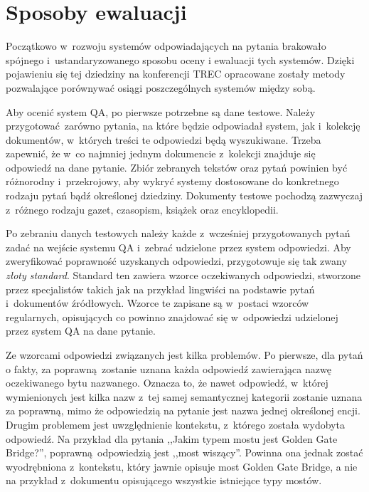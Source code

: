 \documentclass[a4paper, twoside, 12pt]{report}
\begin{document}
    \section{Sposoby ewaluacji}
        Początkowo w~rozwoju systemów odpowiadających na pytania brakowało spójnego i~ustandaryzowanego sposobu oceny i
        ewaluacji tych systemów. Dzięki pojawieniu się tej dziedziny na konferencji TREC opracowane zostały metody
        pozwalające porównywać osiągi poszczególnych systemów między sobą.

        Aby ocenić system QA, po pierwsze potrzebne są dane testowe. Należy przygotować zarówno pytania, na które będzie
        odpowiadał system, jak i~kolekcję dokumentów, w~których treści te odpowiedzi będą wyszukiwane. Trzeba zapewnić,
        że w~co najmniej jednym dokumencie z~kolekcji znajduje się odpowiedź na dane pytanie. Zbiór zebranych
        tekstów oraz pytań powinien być różnorodny i~przekrojowy, aby wykryć systemy dostosowane do konkretnego
        rodzaju pytań bądź określonej dziedziny. Dokumenty testowe pochodzą zazwyczaj z~różnego rodzaju gazet, czasopism,
        książek oraz encyklopedii.

        Po zebraniu danych testowych należy każde z~wcześniej przygotowanych pytań zadać na wejście systemu QA i~zebrać
        udzielone przez system odpowiedzi. Aby zweryfikować poprawność uzyskanych odpowiedzi, przygotowuje się tak zwany
        \emph{złoty standard}. Standard ten zawiera wzorce oczekiwanych odpowiedzi, stworzone przez specjalistów takich
        jak na przykład lingwiści na podstawie pytań i~dokumentów źródłowych. Wzorce te zapisane są w~postaci wzorców
        regularnych, opisujących co powinno znajdować się w~odpowiedzi udzielonej przez system QA na dane pytanie.

        Ze wzorcami odpowiedzi związanych jest kilka problemów. Po pierwsze, dla pytań o fakty, za poprawną zostanie
        uznana każda odpowiedź zawierająca nazwę oczekiwanego bytu nazwanego. Oznacza to, że nawet odpowiedź, w~której
        wymienionych jest kilka nazw z~tej samej semantycznej kategorii zostanie uznana za poprawną, mimo że odpowiedzią
        na pytanie jest nazwa jednej określonej encji. Drugim problemem jest uwzględnienie kontekstu, z~którego została
        wydobyta odpowiedź. Na przykład dla pytania ,,Jakim typem mostu jest Golden Gate Bridge?'', poprawną odpowiedzią
        jest ,,most wiszący''. Powinna ona jednak zostać wyodrębniona z~kontekstu, który jawnie opisuje most Golden
        Gate Bridge, a nie na przykład z~dokumentu opisującego wszystkie istniejące typy mostów.
\end{document}
